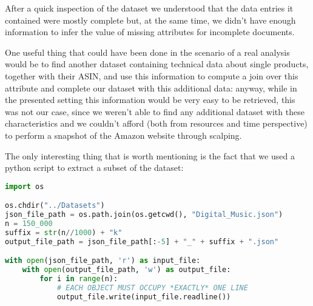 After a quick inspection of the dataset we understood that the data entries it contained were mostly complete but, at the same time, we didn't have enough information to infer the value of missing attributes for incomplete documents.

One useful thing that could have been done in the scenario of a real analysis would be to find another dataset containing technical data about single products, together with their ASIN, and use this information to compute a join over this attribute and complete our dataset with this additional data: anyway, while in the presented setting this information would be very easy to be retrieved, this was not our case, since we weren't able to find any additional dataset with these characteristics and we couldn't afford (both from resources and time perspective) to perform a snapshot of the Amazon website through scalping. 

The only interesting thing that is worth mentioning is the fact that we used a python script to extract a subset of the dataset:\\
\begin{lstlisting}[language=Python]
import os

os.chdir("../Datasets")
json_file_path = os.path.join(os.getcwd(), "Digital_Music.json")
n = 150_000
suffix = str(n//1000) + "k"
output_file_path = json_file_path[:-5] + "_" + suffix + ".json"

with open(json_file_path, 'r') as input_file:
    with open(output_file_path, 'w') as output_file:
        for i in range(n):
            # EACH OBJECT MUST OCCUPY *EXACTLY* ONE LINE
            output_file.write(input_file.readline())
\end{lstlisting}

